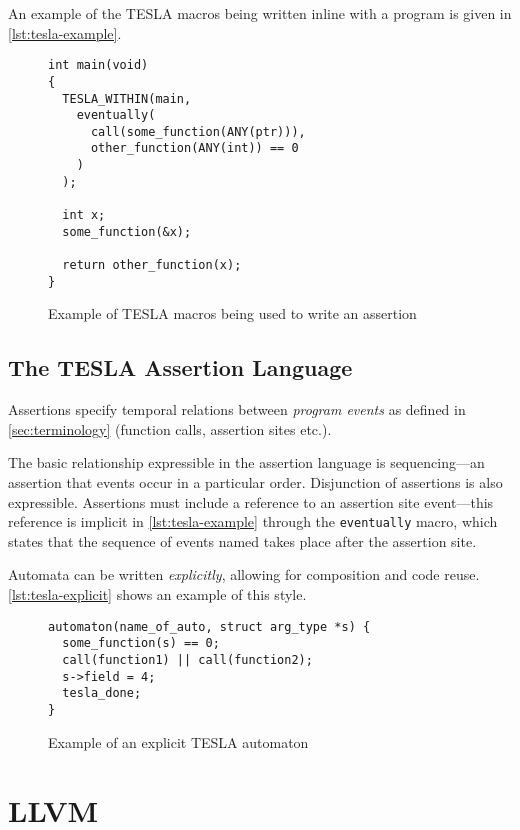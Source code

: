 An example of the TESLA macros being written inline with a program is
given in \autoref{lst:tesla-example}.

\begin{figure}
  \begin{verbatim}
int main(void)
{
  TESLA_WITHIN(main,
    eventually(
      call(some_function(ANY(ptr))),
      other_function(ANY(int)) == 0
    )
  );

  int x;
  some_function(&x);

  return other_function(x);
}
  \end{verbatim}
  \caption{Example of TESLA macros being used to write an assertion}
  \label{lst:tesla-example}
\end{figure}

\subsection{The TESLA Assertion Language} \label{sec:assertions}

Assertions specify temporal relations between \emph{program events} as defined
in \autoref{sec:terminology} (function calls, assertion sites etc.).

The basic relationship expressible in the assertion language is
sequencing---an assertion that events occur in a particular order. Disjunction
of assertions is also expressible. Assertions must include a reference to an
assertion site event---this reference is implicit in \autoref{lst:tesla-example}
through the \texttt{eventually} macro, which states that the sequence of
events named takes place after the assertion site.

Automata can be written \emph{explicitly}, allowing for composition and code
reuse. \autoref{lst:tesla-explicit} shows an example of this style.

\begin{figure}
  \begin{verbatim}
automaton(name_of_auto, struct arg_type *s) {
  some_function(s) == 0;
  call(function1) || call(function2);
  s->field = 4;
  tesla_done;
}
  \end{verbatim}
  \caption{Example of an explicit TESLA automaton}
  \label{lst:tesla-explicit}
\end{figure}

\section{LLVM}

